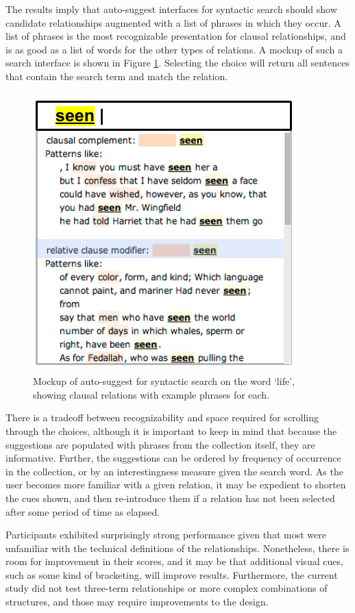 
The results imply that auto-suggest interfaces for syntactic search should show candidate relationships augmented with a list of phrases in which they occur. A list of phrases is the most recognizable presentation for clausal relationships, and is as good as a list of words for the other types of relations. A mockup of such a search interface is shown in Figure \ref{fig:phrases-mockup}.  Selecting the choice will return all sentences that contain the search term and match the relation.
\begin{figure}
\centering
\includegraphics[width=0.5\columnwidth]{fig/phrases-mockup}
\caption{
	\label{fig:phrases-mockup} Mockup of auto-suggest for syntactic search on the word `life', showing clausal relations with example phrases for each.
}
\end{figure}

There is a tradeoff between recognizability and space required for scrolling through the choices, although it is important to keep in mind that because the suggestions are populated with phrases from the collection itself, they are informative.    Further, the suggestions can be ordered by frequency of occurrence in the collection, or by an interestingness measure given the search word.  As the user becomes more familiar with a given relation, it may  be expedient to shorten the cues shown, and then re-introduce them if a relation has not been selected after some period of time as elapsed.

Participants exhibited surprisingly strong performance given that most were unfamiliar with the technical definitions of the relationships.  Nonetheless, there is room for improvement in their scores, and it may be that additional visual cues, such as some kind of bracketing, will improve results.  Furthermore, the current study did not test three-term relationships or more complex combinations of structures, and those may require improvements to the design.